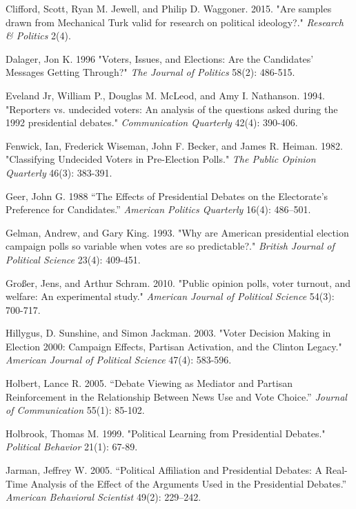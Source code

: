 \documentclass[12pt]{article}
\begin{document}
{{{{\begin{thebibliography}{20}
 Clifford, Scott, Ryan M. Jewell, and Philip D. Waggoner. 2015. "Are samples drawn from Mechanical Turk valid for research on political ideology?." \emph{Research & Politics} 2(4).

 Dalager, Jon K. 1996 "Voters, Issues, and Elections: Are the Candidates' Messages Getting Through?" \emph{The Journal of Politics} 58(2): 486-515.

 Eveland Jr, William P., Douglas M. McLeod, and Amy I. Nathanson. 1994. "Reporters vs. undecided voters: An analysis of the questions asked during the 1992 presidential debates." \emph{Communication Quarterly} 42(4): 390-406.

 Fenwick, Ian, Frederick Wiseman, John F. Becker, and James R. Heiman. 1982. "Classifying Undecided Voters in Pre-Election Polls." \emph{The Public Opinion Quarterly} 46(3): 383-391. 

 Geer, John G. 1988 “The Effects of Presidential Debates on the Electorate’s Preference for Candidates.” \emph{American Politics Quarterly} 16(4): 486–501.

 Gelman, Andrew, and Gary King. 1993. "Why are American presidential election campaign polls so variable when votes are so predictable?." \emph{British Journal of Political Science} 23(4): 409-451.

 Großer, Jens, and Arthur Schram. 2010. "Public opinion polls, voter turnout, and welfare: An experimental study." \emph{American Journal of Political Science} 54(3): 700-717.

 Hillygus, D. Sunshine, and Simon Jackman. 2003. "Voter Decision Making in Election 2000: Campaign Effects, Partisan Activation, and the Clinton Legacy." \emph{American Journal of Political Science} 47(4): 583-596. 

 Holbert, Lance R. 2005. “Debate Viewing as Mediator and Partisan Reinforcement in the Relationship Between News Use and Vote Choice.” \emph{Journal of Communication} 55(1): 85-102.

 Holbrook, Thomas M. 1999. "Political Learning from Presidential Debates." \emph{Political Behavior} 21(1): 67-89.

 Jarman, Jeffrey W. 2005. “Political Affiliation and Presidential Debates: A Real-Time Analysis of the Effect of the Arguments Used in the Presidential Debates.” \emph{American Behavioral Scientist} 49(2): 229–242. 


\end{thebibliography}}}}}
\end{document}
